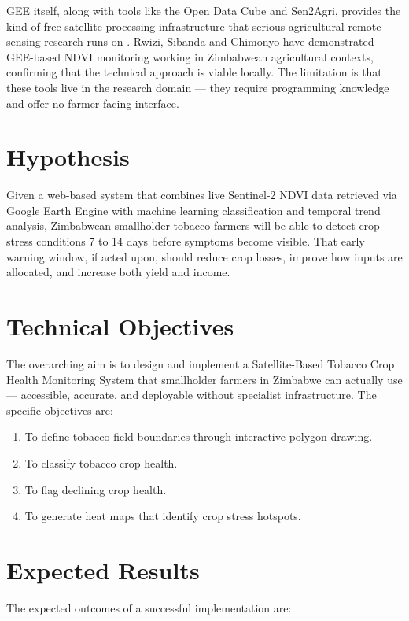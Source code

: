 \documentclass[12pt,a4paper]{report}
\begin{document}
GEE itself, along with tools like the Open Data Cube and Sen2Agri, provides the kind of free satellite processing infrastructure that serious agricultural remote sensing research runs on \citep{gorelick2017}. Rwizi, Sibanda and Chimonyo \citep*{rwizi2021} have demonstrated GEE-based NDVI monitoring working in Zimbabwean agricultural contexts, confirming that the technical approach is viable locally. The limitation is that these tools live in the research domain — they require programming knowledge and offer no farmer-facing interface.

\section{Hypothesis}

Given a web-based system that combines live Sentinel-2 NDVI data retrieved via Google Earth Engine with machine learning classification and temporal trend analysis, Zimbabwean smallholder tobacco farmers will be able to detect crop stress conditions 7 to 14 days before symptoms become visible. That early warning window, if acted upon, should reduce crop losses, improve how inputs are allocated, and increase both yield and income.

\section{Technical Objectives}

The overarching aim is to design and implement a Satellite-Based Tobacco Crop Health Monitoring System that smallholder farmers in Zimbabwe can actually use — accessible, accurate, and deployable without specialist infrastructure. The specific objectives are:

\begin{enumerate}
  \item To define tobacco field boundaries through interactive polygon drawing. 
  \item To classify tobacco crop health. 
  \item To flag declining crop health. 
  \item To generate heat maps that identify crop stress hotspots.
\end{enumerate}

\section{Expected Results}

The expected outcomes of a successful implementation are:
\end{document}
